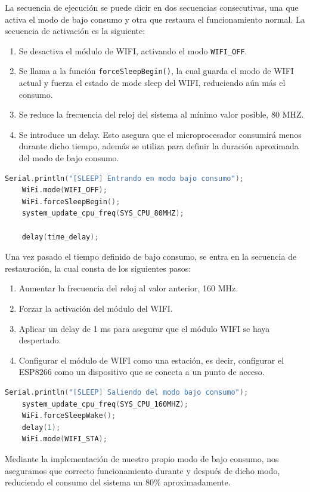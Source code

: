La secuencia de ejecución se puede dicir en dos secuencias consecutivas, una que activa el modo de bajo consumo y otra que restaura el funcionamiento normal. La secuencia de activación es la siguiente:

\begin{enumerate}
    \item Se desactiva el módulo de WIFI, activando el modo \texttt{WIFI\_OFF}.
    \item Se llama a la función \texttt{forceSleepBegin()}, la cual guarda el modo de WIFI actual y fuerza el estado de mode sleep del WIFI, reduciendo aún más el consumo.
    \item Se reduce la frecuencia del reloj del sistema al mínimo valor posible, 80 MHZ.
    \item Se introduce un delay. Esto asegura que el microprocesador consumirá menos durante dicho tiempo, además se utiliza para definir la duración aproximada del modo de bajo consumo.
\end{enumerate}

\begin{lstlisting}[captionpos=b, caption={Activación modo bajo consumo}, language=c++]
    Serial.println("[SLEEP] Entrando en modo bajo consumo");
    WiFi.mode(WIFI_OFF);
    WiFi.forceSleepBegin();
    system_update_cpu_freq(SYS_CPU_80MHZ);

    delay(time_delay);
\end{lstlisting}

Una vez pasado el tiempo definido de bajo consumo, se entra en la secuencia de restauración, la cual consta de los siguientes pasos:

\begin{enumerate}
    \item Aumentar la frecuencia del reloj al valor anterior, 160 MHz.
    \item Forzar la activación del módulo del WIFI.
    \item Aplicar un delay de 1 ms para asegurar que el módulo WIFI se haya despertado.
    \item Configurar el módulo de WIFI como una estación, es decir, configurar el ESP8266 como un dispositivo que se conecta a un punto de acceso.
\end{enumerate}

\begin{lstlisting}[captionpos=b, caption={Restauración modo bajo consumo}, language=c++]
    Serial.println("[SLEEP] Saliendo del modo bajo consumo");
    system_update_cpu_freq(SYS_CPU_160MHZ);
    WiFi.forceSleepWake();
    delay(1);
    WiFi.mode(WIFI_STA);
\end{lstlisting}

Mediante la implementación de nuestro propio modo de bajo consumo, nos aseguramos que correcto funcionamiento durante y después de dicho modo, reduciendo el consumo del sistema un 80\% aproximadamente.


